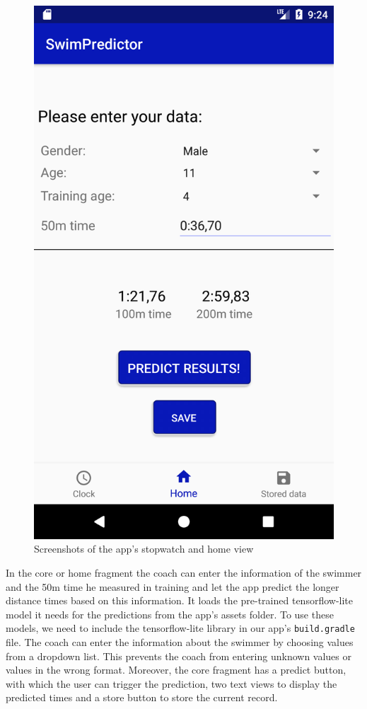 \begin{figure}[ht]
\begin{minipage}{0.2\textwidth}
\includegraphics[width=\textwidth]{visualisation/prediction_view.png}
\end{minipage}
\caption{Screenshots of the app's stopwatch and home view}
\label{fig:app_screenshots}
\end{figure}
In the core or home fragment the coach can enter the information of the swimmer and the 50m time he measured in training and let the app predict the longer distance times based on this information. It loads the pre-trained tensorflow-lite model it needs for the predictions from the app's assets folder. To use these models, we need to include the tensorflow-lite library in our app's \texttt{build.gradle} file. The coach can enter the information about the swimmer by choosing values from a dropdown list. This prevents the coach from entering unknown values or values in the wrong format. Moreover, the core fragment has a predict button, with which the user can trigger the prediction, two text views to display the predicted times and a store button to store the current record.\\
